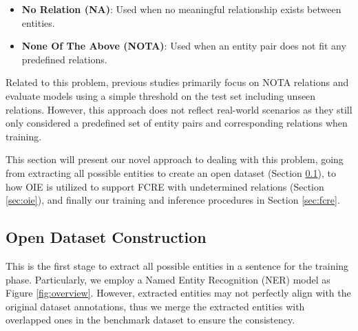 \begin{itemize}
    \item \textbf{No Relation (NA)}: Used when no meaningful relationship exists between entities. 
    \item \textbf{None Of The Above (NOTA)}: Used when an entity pair does not fit any predefined relations.
\end{itemize}

Related to this problem, previous studies \citep{zhao-etal-2025-dynamic} primarily focus on NOTA relations and evaluate models using a simple threshold on the test set including unseen relations. However, this approach does not reflect real-world scenarios as they still only considered a predefined set of entity pairs and corresponding relations when training. 

This section will present our novel approach to dealing with this problem, going from extracting all possible entities to create an open dataset (Section \ref{sec:dataset}), to how OIE is utilized to support FCRE with undetermined relations (Section \ref{sec:oie}), and finally our training and inference procedures in Section \ref{sec:fcre}.  

\subsection{Open Dataset Construction}
\label{sec:dataset}

This is the first stage to extract all possible entities in a sentence for the training phase. Particularly, we employ a Named Entity Recognition (NER) model as Figure \ref{fig:overview}. However, extracted entities may not perfectly align with the original dataset annotations, thus we merge the extracted entities with overlapped ones in the benchmark dataset to ensure the consistency. 


